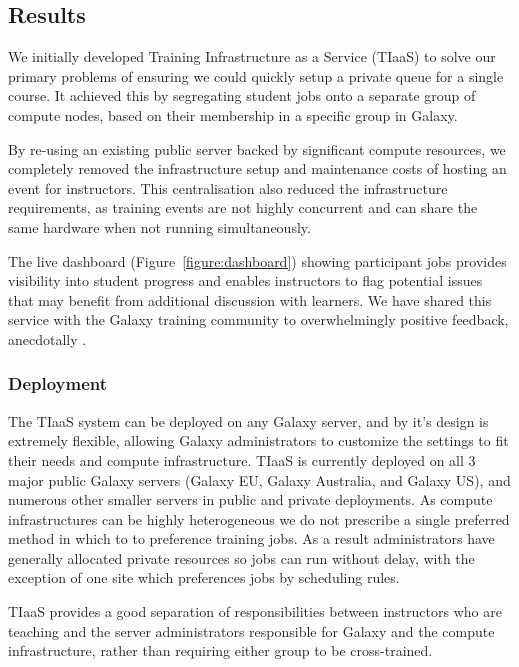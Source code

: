 \documentclass[a4paper,num-refs]{oup-contemporary}
\begin{document}
\subsection{Results}

We initially developed Training Infrastructure as a Service (TIaaS) to solve our primary problems of ensuring we could quickly setup a private queue for a single course. It achieved this by segregating student jobs onto a separate group of compute nodes, based on their membership in a specific group in Galaxy.

By re-using an existing public server backed by significant compute resources, we completely removed the infrastructure setup and maintenance costs of hosting an event for instructors. This centralisation also reduced the infrastructure requirements, as training events are not highly concurrent and can share the same hardware when not running simultaneously.

The live dashboard (Figure~\ref{figure:dashboard}) showing participant jobs provides visibility into student progress and enables instructors to flag potential issues that may benefit from additional discussion with learners. We have shared this service with the Galaxy training community to overwhelmingly positive feedback, anecdotally \cite{tiaas_feedback}.

\subsubsection{Deployment}

The TIaaS system can be deployed on any Galaxy server, and by it's design is extremely flexible, allowing Galaxy administrators to customize the settings to fit their needs and compute infrastructure. TIaaS is currently deployed on all 3 major public Galaxy servers (Galaxy EU, Galaxy Australia, and Galaxy US), and numerous other smaller servers in public and private deployments. As compute infrastructures can be highly heterogeneous we do not prescribe a single preferred method in which to to preference training jobs. As a result administrators have generally allocated private resources so jobs can run without delay, with the exception of one site which preferences jobs by scheduling rules.

TIaaS provides a good separation of responsibilities between instructors who are teaching and the server administrators responsible for Galaxy and the compute infrastructure, rather than requiring either group to be cross-trained.
\end{document}
